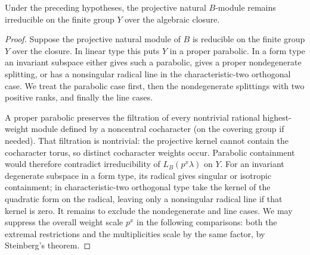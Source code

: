 \begin{lemma}
\label{fb:natural-restriction}
Under the preceding hypotheses, the projective natural \(B\)-module remains
irreducible on the finite group \(Y\) over the algebraic closure.
\end{lemma}
\begin{proof}

Suppose the projective natural module of \(B\) is reducible on the
finite group \(Y\) over the closure.  In linear type this puts \(Y\)
in a proper parabolic.  In a form type an invariant subspace either
gives such a parabolic, gives a proper nondegenerate splitting, or
has a nonsingular radical line in the characteristic-two orthogonal
case.  We treat the parabolic case first, then the nondegenerate
splittings with two positive ranks, and finally the line cases.

A proper parabolic preserves the filtration of every nontrivial
rational highest-weight module defined by a noncentral cocharacter
(on the covering group if needed).  That filtration is nontrivial:
the projective kernel cannot contain the cocharacter torus, so
distinct cocharacter weights occur.  Parabolic containment would
therefore contradict irreducibility of \(L_B(p^x\lambda)\) on \(Y\).
For an invariant degenerate subspace in a form type, its radical
gives singular or isotropic containment; in characteristic-two
orthogonal type take the kernel of the quadratic form on the radical,
leaving only a nonsingular radical line if that kernel is zero.
It remains to exclude the nondegenerate and line cases.  We may
suppress the overall weight scale \(p^x\) in the following comparisons:
both the extremal restrictions and the multiplicities scale by the
same factor, by Steinberg's theorem.


\end{proof}
